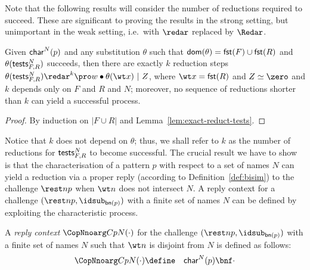 \documentclass{LMCS}
\renewcommand{\beq}{\simeq}
\begin{document}
Note that the following results will consider the number of reductions required to succeed.
These are significant to proving the results in the strong setting, but unimportant in
the weak setting, i.e.\ with $\redar$ replaced by $\Redar$.

\begin{lem}
\label{lem:min-reduct-charP}
Given ${\sf char}^N(p)$ and any substitution $\theta$
such that ${\sf dom}(\theta) = {\sf fst}(F)\cup{\sf fst}(R)$ and $\theta({\sf tests}^N_{F,R})$ succeeds,
then there are exactly $k$ reduction steps $\theta({\sf tests}^N_{F,R})\redar^k \pro w\bullet \theta(\wt x)\ |\ Z$,
where $\wt x = {\sf fst}(R)$ and $Z \beq \zero$ and $k$ depends only on $F$ and $R$ and $N$; moreover,
no sequence of reductions shorter than $k$ can yield a successful process.
\end{lem}
\begin{proof}
By induction on $|F \cup R|$ and Lemma~\ref{lem:exact-reduct-tests}.
\end{proof}

Notice that $k$ does not depend on $\theta$; thus, we shall refer to $k$ as the number of 
reductions for ${\sf tests}^N_{F,R}$ to become successful.
The crucial result we have to show is that the characterisation of a pattern $p$ with respect to a set of names $N$ can yield a reduction via a proper reply (according to Definition~\ref{def:bisim}) to the challenge $\rest n p$ when $\wt n$ does not intersect $N$.
A reply context for a challenge $(\rest n p,\idsub_{{\sf bn}(p)})$ with a finite set of names $N$ can be defined by exploiting the characteristic process.

\begin{defi}
\label{def:reply-context}
A {\em reply context} $\CopNnoarg C p N (\cdot)$ for the challenge $(\rest n p,\idsub_{{\sf bn}(p)})$ with a finite set of names $N$ such that $\wt n$ is disjoint from $N$ is defined as follows:
\begin{eqnarray*}
\CopNnoarg C p N (\cdot) &\define& {\sf char}^{N}(p)\bnf \cdot
\end{eqnarray*}
\end{defi}
\end{document}
